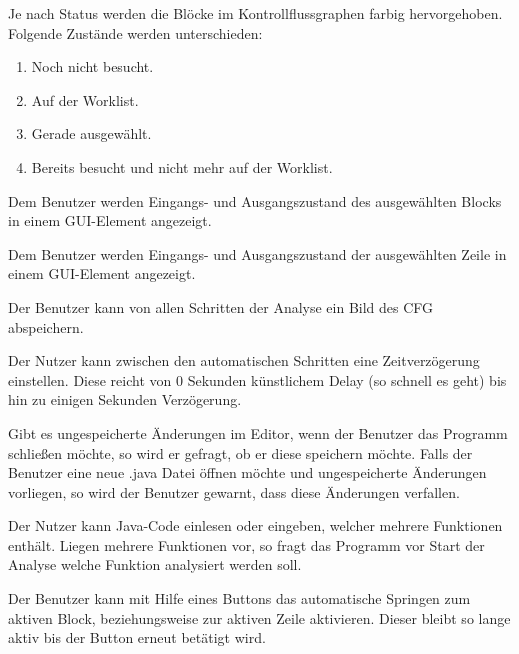 Je nach Status werden die Blöcke im Kontrollflussgraphen farbig hervorgehoben. Folgende Zustände werden unterschieden:
\begin{enumerate}[label=(\alph*)]
\item Noch nicht besucht.
\item Auf der Worklist.
\item Gerade ausgewählt.
\item Bereits besucht und nicht mehr auf der Worklist.
\end{enumerate}

Dem Benutzer werden Eingangs- und Ausgangszustand des ausgewählten Blocks in einem GUI-Element angezeigt.

Dem Benutzer werden Eingangs- und Ausgangszustand der ausgewählten Zeile in einem GUI-Element angezeigt.

Der Benutzer kann von allen Schritten der Analyse ein Bild des CFG abspeichern.

Der Nutzer kann zwischen den automatischen Schritten eine Zeitverzögerung einstellen. Diese reicht von 0 Sekunden künstlichem Delay (so schnell es geht) bis hin zu einigen Sekunden Verzögerung.

Gibt es ungespeicherte Änderungen im Editor, wenn der Benutzer das Programm schließen möchte, so wird er gefragt, ob er diese speichern möchte.
Falls der Benutzer eine neue .java Datei öffnen möchte und ungespeicherte Änderungen vorliegen, so wird der Benutzer gewarnt, dass diese Änderungen verfallen.

Der Nutzer kann Java-Code einlesen oder eingeben, welcher mehrere Funktionen
enthält. Liegen mehrere Funktionen vor, so fragt das Programm vor Start der Analyse welche Funktion analysiert werden soll.

Der Benutzer kann mit Hilfe eines Buttons das automatische Springen zum aktiven Block, beziehungsweise zur aktiven Zeile aktivieren. Dieser bleibt so lange aktiv bis der Button erneut betätigt wird.


